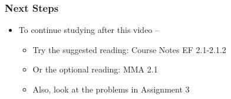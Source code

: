 \documentclass[10pt,english,aspectratio=169,handout]{beamer}
\begin{document}
\begin{frame} \frametitle{Next Steps}

\begin{itemize}
\setlength\itemsep{5mm}
\item To continue studying after this video -- \vspace{2mm}

\begin{itemize}
 \setlength\itemsep{3mm}
 \item Try the suggested reading: Course Notes EF 2.1-2.1.2
 \item Or the optional reading: MMA 2.1
 \item Also, look at the problems in Assignment 3
\end{itemize}
\end{itemize}


\end{frame}
\end{document}
